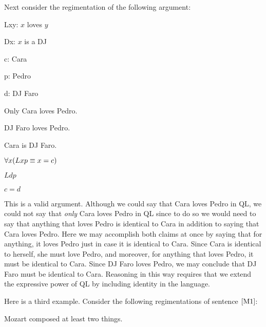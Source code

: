 Next consider the regimentation of the following argument:

\begin{multicols}{2}

\begin{ekey}
  \item[Lxy:] $x$ loves $y$
  \item[Dx:] $x$ is a DJ
  \item[c:] Cara
  \item[p:] Pedro
  \item[d:] DJ Faro
\end{ekey}

\vfill
\strut
\columnbreak

\begin{earg}
  \item[] Only Cara loves Pedro.
  \item[] DJ Faro loves Pedro.
  \item[\therefore] Cara is DJ Faro.
\end{earg}

\begin{earg}
  \item[] $\forall x(Lxp \equiv x=c)$
  \item[] $Ldp$
  \item[\therefore] $c=d$
\end{earg}

\end{multicols}

This is a valid argument.
Although we could say that Cara loves Pedro in QL, we could not say that \textit{only} Cara loves Pedro in QL since to do so we would need to say that anything that loves Pedro is identical to Cara in addition to saying that Cara loves Pedro.
Here we may accomplish both claims at once by saying that for anything, it loves Pedro just in case it is identical to Cara.
Since Cara is identical to herself, she must love Pedro, and moreover, for anything that loves Pedro, it must be identical to Cara.
Since DJ Faro loves Pedro, we may conclude that DJ Faro must be identical to Cara.
Reasoning in this way requires that we extend the expressive power of QL by including identity in the language.

Here is a third example. 
Consider the following regimentations of sentence $\ref{M1}$:

\begin{earg}
  \item[\ex{M1}] Mozart composed at least two things.
\end{earg}

